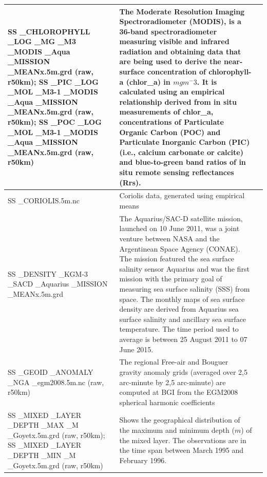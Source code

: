 \documentclass[journal abbreviation, manuscript]{copernicus}
\begin{document}
\begin{longtable}{|p{}|p{}|p{}|}
        \hline 
        SS \_CHLOROPHYLL \_LOG \_MG \_M3 \_MODIS \_Aqua \_MISSION \_MEANx.5m.grd (raw, r50km); SS \_PIC \_LOG \_MOL \_M3-1 \_MODIS \_Aqua \_MISSION \_MEANx.5m.grd (raw, r50km); SS \_POC \_LOG \_MOL \_M3-1 \_MODIS \_Aqua \_MISSION \_MEANx.5m.grd (raw, r50km)  & The Moderate Resolution Imaging Spectroradiometer (MODIS), is a 36-band spectroradiometer measuring visible and infrared radiation and obtaining data that are being used to derive the near-surface concentration of chlorophyll-a (chlor\_a) in $mg m^-3$. It is calculated using an empirical relationship derived from in situ measurements of chlor\_a, concentrations of Particulate Organic Carbon (POC) and Particulate Inorganic Carbon (PIC) (i.e., calcium carbonate or calcite) and blue-to-green band ratios of in situ remote sensing reflectances (Rrs). & \cite{nasaaqua} \\
        \hline 
        SS \_CORIOLIS.5m.nc  & Coriolis data, generated using empirical means & \cite{lee_2020_3675364}\\
        \hline 
        SS \_DENSITY \_KGM-3 \_SACD \_Aquarius \_MISSION \_MEANx.5m.grd & The Aquarius/SAC-D satellite mission, launched on 10 June 2011, was a joint venture between NASA and the Argentinean Space Agency (CONAE). The mission featured the sea surface salinity sensor Aquarius and was the first mission with the primary goal of measuring sea surface salinity (SSS) from space. The monthly maps of sea surface density are derived from Aquarius sea surface salinity and ancillary sea surface temperature. The time period used to average is between 25 August 2011 to 07 June 2015.  & \cite{nasaaquarius} \\
        \hline 

         SS \_GEOID \_ANOMALY \_NGA \_egm2008.5m.nc (raw, r50km) & The regional Free-air and Bouguer gravity anomaly grids (averaged over 2,5 arc-minute by 2,5 arc-minute) are computed at BGI from the EGM2008 spherical harmonic coefficients & \cite{NGA_EGM20082008} \\
        \hline 
        SS \_MIXED \_LAYER \_DEPTH \_MAX \_M \_Goyetx.5m.grd (raw, r50km); 
         SS \_MIXED \_LAYER \_DEPTH \_MIN \_M \_Goyetx.5m.grd (raw, r50km)& Shows the geographical distribution of the maximum and minimum depth ($m$) of the mixed layer. The observations are in the time span between March 1995 and February 1996. & \cite{goyetMLD} \\
        \hline
        

\end{longtable}
\end{document}
